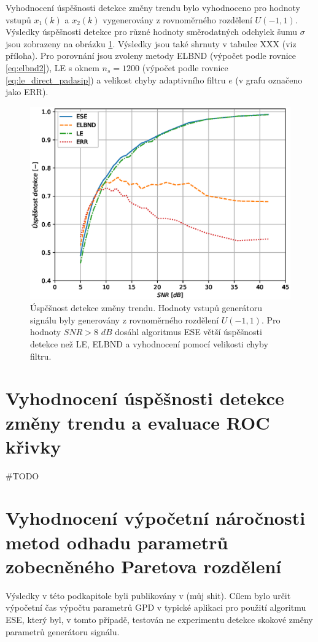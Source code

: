 Vyhodnocení úspěšnosti detekce změny trendu bylo vyhodnoceno pro hodnoty vstupů $x_1(k)$ a $x_2(k)$ vygenerovány z rovnoměrného rozdělení $U(-1,1)$. Výsledky úspěšnosti detekce pro různé hodnoty směrodatných odchylek šumu $\sigma$ jsou zobrazeny na obrázku \ref{fig:trend_stats}. Výsledky jsou také shrnuty v tabulce XXX (viz příloha). Pro porovnání jsou zvoleny metody ELBND (výpočet podle rovnice \ref{eq:elbnd2}), LE s oknem $n_s=1200$ (výpočet podle rovnice \ref{eq:le_direct_padasip}) a velikost chyby adaptivního filtru $e$ (v grafu označeno jako ERR).

\begin{figure}[!ht]
    \centering
    \includegraphics[scale=0.63]{IMG/mdpi/trendchange_stats.eps}
    \caption{Úspěšnost detekce změny trendu. Hodnoty vstupů generátoru signálu byly generovány z rovnoměrného rozdělení $U(-1,1)$. Pro hodnoty $SNR > 8$ $dB$ dosáhl algoritmus ESE větší úspěšnosti detekce než LE, ELBND a vyhodnocení pomocí velikosti chyby filtru.}
    \label{fig:trend_stats}
\end{figure}

\section{Vyhodnocení úspěšnosti detekce změny trendu a evaluace ROC křivky}
\#TODO
\section{Vyhodnocení výpočetní náročnosti metod odhadu parametrů zobecněného Paretova rozdělení}
Výsledky v této podkapitole byli publikovány v (můj shit). Cílem bylo určit výpočetní čas výpočtu parametrů GPD v typické aplikaci pro použití algoritmu ESE, který byl, v tomto případě, testován ne experimentu detekce skokové změny parametrů generátoru signálu.
